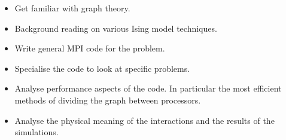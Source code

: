 \documentclass{article}
\begin{document}
\begin{itemize}
\item Get familiar with graph theory.
\item Background reading on various Ising model techniques.
\item Write general MPI code for the problem.
\item Specialise the code to look at specific problems.
\item Analyse performance aspects of the code. In particular the most efficient methods of dividing the graph between processors.
\item Analyse the physical meaning of the interactions and the results of the simulations.
\end{itemize}
\end{document}
